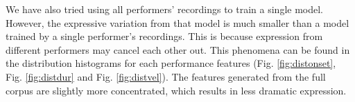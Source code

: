 
We have also tried using all performers' recordings to train a single model. However, the expressive variation from that model is much smaller than a model trained by a single performer's recordings. This is because expression from different performers may cancel each other out. This phenomena can be found in the distribution histograms for each performance features (Fig. \ref{fig:distonset}, Fig. \ref{fig:distdur} and Fig. \ref{fig:distvel}). The features generated from the full corpus are slightly more concentrated, which results in less dramatic expression.


